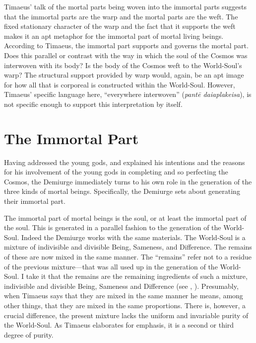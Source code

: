 Timaeus' talk of the mortal parts being woven into the immortal parts suggests that the immortal parts are the warp and the mortal parts are the weft. The fixed stationary character of the warp and the fact that it supports the weft makes it an apt metaphor for the immortal part of mortal living beings. According to Timaeus, the immortal part supports and governs the mortal part. Does this parallel or contrast with the way in which the soul of the Cosmos was interwoven with its body? Is the body of the Cosmos weft to the World-Soul's warp? The structural support provided by warp would, again, be an apt image for how all that is corporeal is constructed within the World-Soul. However, Timaeus' specific language here, ``everywhere interwoven'' (\emph{pantē daiaplakeisa}), is not specific enough to support this interpretation by itself.


\section{The Immortal Part} %
\label{sec:the_immortal_part}

Having addressed the young gods, and explained his intentions and the reasons for his involvement of the young gods in completing and so perfecting the Cosmos, the Demiurge immediately turns to his own role in the generation of the three kinds of mortal beings. Specifically, the Demiurge sets about generating their immortal part. 

The immortal part of mortal beings is the soul, or at least the immortal part of the soul. This is generated in a parallel fashion to the generation of the World-Soul. Indeed the Demiurge works with the same materials. The World-Soul is a mixture of indivisible and divisible Being, Sameness, and Difference. The remains of these are now mixed in the same manner. The ``remains'' refer not to a residue of the previous mixture---that was all used up in the generation of the World-Soul. I take it that the remains are the remaining ingredients of such a mixture, indivisible and divisible Being, Sameness and Difference (see \citealt[141 n10]{Archer-Hind:1888qd}, \citealt[255]{Taylor:1928qb}). Presumably, when Timaeus says that they are mixed in the same manner he means, among other things, that they are mixed in the same proportions. There is, however, a crucial difference, the present mixture lacks the uniform and invariable purity of the World-Soul. As Timaeus elaborates for emphasis, it is a second or third degree of purity. 

